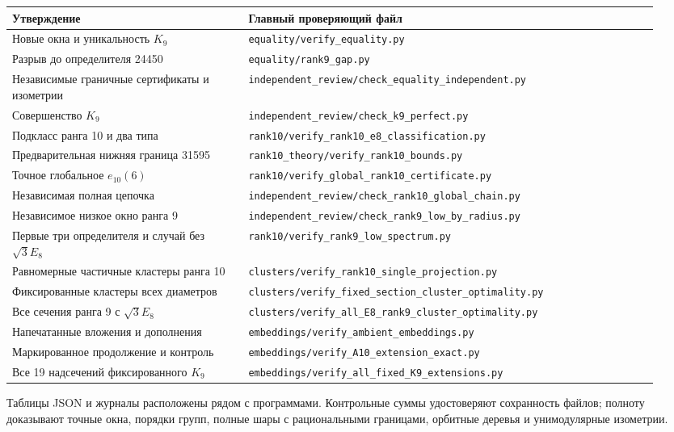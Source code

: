 \documentclass[11pt,a4paper]{article}
\theoremstyle{remark}\newtheorem{remark}[theorem]{Замечание}
\newcommand{\file}[1]{{\small\nolinkurl{#1}}}
\begin{document}
\begin{longtable}{P{0.34\linewidth}P{0.59\linewidth}}
\toprule
Утверждение & Главный проверяющий файл\\\midrule
\endhead
Новые окна и уникальность $K_9$ &\file{equality/verify_equality.py}\\[3pt]
Разрыв до определителя 24450 &\file{equality/rank9_gap.py}\\[3pt]
Независимые граничные сертификаты и изометрии &\file{independent_review/check_equality_independent.py}\\[3pt]
Совершенство $K_9$ &\file{independent_review/check_k9_perfect.py}\\[3pt]
Подкласс ранга 10 и два типа &\file{rank10/verify_rank10_e8_classification.py}\\[3pt]
Предварительная нижняя граница 31595 &\file{rank10_theory/verify_rank10_bounds.py}\\[3pt]
Точное глобальное $e_{10}(6)$ &\file{rank10/verify_global_rank10_certificate.py}\\[3pt]
Независимая полная цепочка &\file{independent_review/check_rank10_global_chain.py}\\[3pt]
Независимое низкое окно ранга 9 &\file{independent_review/check_rank9_low_by_radius.py}\\[3pt]
Первые три определителя и случай без $\sqrt3E_8$ &\file{rank10/verify_rank9_low_spectrum.py}\\[3pt]
Равномерные частичные кластеры ранга 10 &\file{clusters/verify_rank10_single_projection.py}\\[3pt]
Фиксированные кластеры всех диаметров &\file{clusters/verify_fixed_section_cluster_optimality.py}\\[3pt]
Все сечения ранга 9 с $\sqrt3E_8$ &\file{clusters/verify_all_E8_rank9_cluster_optimality.py}\\[3pt]
Напечатанные вложения и дополнения &\file{embeddings/verify_ambient_embeddings.py}\\[3pt]
Маркированное продолжение и контроль &\file{embeddings/verify_A10_extension_exact.py}\\
Все 19 надсечений фиксированного $K_9$ &\file{embeddings/verify_all_fixed_K9_extensions.py}\\
\bottomrule
\end{longtable}

Таблицы JSON и журналы расположены рядом с программами. Контрольные суммы удостоверяют сохранность файлов; полноту доказывают точные окна, порядки групп, полные шары с рациональными границами, орбитные деревья и унимодулярные изометрии.
\end{document}
